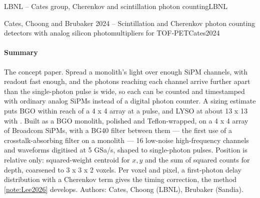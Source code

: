 \begin{programnote}{LBNL -- Cates group, Cherenkov and scintillation photon counting}{LBNL}
\begin{papernote}{Cates, Choong and Brubaker 2024 -- Scintillation and Cherenkov photon counting detectors with analog silicon photomultipliers for TOF-PET}{Cates2024}
\paragraph{Summary}
The concept paper. Spread a monolith's light over enough SiPM channels, with
readout fast enough, and the photons reaching each channel arrive further
apart than the single-photon pulse is wide, so each can be counted and
timestamped with ordinary analog SiPMs instead of a digital photon counter.
A sizing estimate puts BGO within reach of a 4 x 4 array at a  pulse,
and LYSO at about 13 x 13 with . Built as a
 BGO monolith, polished and Teflon-wrapped, on
a 4 x 4 array of  Broadcom SiPMs, with a  BG40
filter between them --- the first use of a crosstalk-absorbing filter on a
monolith --- 16 low-noise high-frequency channels and waveforms digitised at
5 GSa/s, shaped to  single-photon pulses. Position is relative only:
squared-weight centroid for $x,y$ and the sum of squared counts for depth,
coarsened to 3 x 3 x 2 voxels. Per voxel and pixel, a first-photon
delay distribution with a Cherenkov term gives the timing correction, the
method \ref{note:Lee2026} develops.
Authors: Cates, Choong (LBNL), Brubaker (Sandia).


\end{papernote}
\end{programnote}
